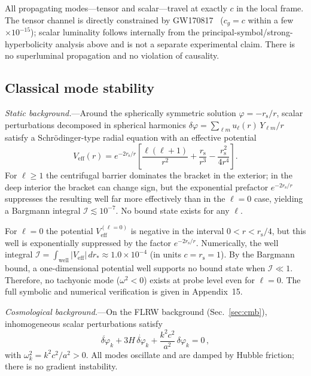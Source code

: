 \documentclass[aps,prd,onecolumn,superscriptaddress,nofootinbib,showpacs,12pt]{revtex4-2}
\newcommand{\rs}{r_{\mathrm{s}}}
\begin{document}
All propagating modes---tensor and scalar---travel at
exactly $c$ in the local frame.  The tensor channel is
directly constrained by GW170817~\cite{LIGO_GW170817}
($c_g = c$ within a few$\times 10^{-15}$);
scalar luminality follows internally from the
principal-symbol/strong-hyperbolicity analysis above and
is not a separate experimental claim.  There is no
superluminal propagation and no violation of causality.

\subsection{Classical mode stability}
\label{sec:mode_stability}

\textit{Static background.}---Around the spherically
symmetric solution $\varphi = -\rs/r$, scalar perturbations
decomposed in spherical harmonics
$\delta\varphi = \sum_{\ell m}u_{\ell}(r)\,Y_{\ell m}/r$
satisfy a Schr\"odinger-type radial equation with an
effective potential
\begin{equation}\label{eq:Veff_pert}
  V_{\mathrm{eff}}(r) = e^{-2\rs/r}\left[
    \frac{\ell(\ell+1)}{r^{2}}
    + \frac{\rs}{r^{3}} - \frac{\rs^{2}}{4r^{4}}
  \right].
\end{equation}
For $\ell \geq 1$ the centrifugal barrier dominates
the bracket in the exterior; in the deep interior the
bracket can change sign, but the exponential prefactor
$e^{-2\rs/r}$ suppresses the resulting well far more
effectively than in the $\ell=0$ case, yielding a
Bargmann integral $\mathcal{I}\lesssim 10^{-7}$.
No bound state exists for any $\ell$.

For $\ell=0$ the potential $V_{\mathrm{eff}}^{(\ell=0)}$ is negative
in the interval $0<r<\rs/4$, but this well is exponentially
suppressed by the factor $e^{-2\rs/r}$.  Numerically, the
well integral
$\mathcal{I}=\int_{\mathrm{well}}|V_{\mathrm{eff}}|\,dr_*
\approx 1.0\times 10^{-4}$
(in units $c=\rs=1$).
By the Bargmann bound, a one-dimensional potential well supports
no bound state when $\mathcal{I}\ll 1$.  Therefore, no tachyonic
mode ($\omega^2<0$) exists at probe level even for $\ell=0$.
The full symbolic and numerical verification is given in Appendix~15.

\textit{Cosmological background.}---On the FLRW background
(Sec.~\ref{sec:cmb}), inhomogeneous scalar perturbations
satisfy
\begin{equation}\label{eq:pert_cosmo_stab}
  \ddot{\delta\varphi}_{k} + 3H\,\dot{\delta\varphi}_{k}
  + \frac{k^{2}c^{2}}{a^{2}}\,\delta\varphi_{k} = 0\,,
\end{equation}
with $\omega_{k}^{2} = k^{2}c^{2}/a^{2} > 0$.  All modes
oscillate and are damped by Hubble friction; there is no
gradient instability.
\end{document}
